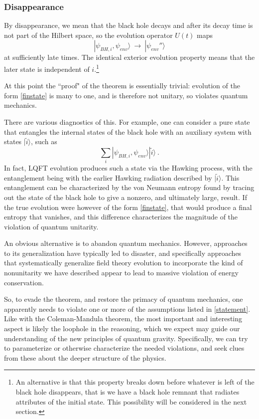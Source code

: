 \documentclass[11pt]{article}
\numberwithin{equation}{section}
\newcommand{\beq}{\begin{equation}}
\newcommand{\eeq}{\end{equation}}
\begin{document}
\subsubsection{Disappearance}

By disappearance, we mean that the black hole decays and after its decay time is not 
 part of the Hilbert space, so the evolution operator $U(t)$  maps
\beq\label{finstate}
|\psi_{BH,i},\psi_{env}\rangle\ \rightarrow\ |\psi_{env}''\rangle
\eeq
at sufficiently late times.  The identical exterior evolution property means that the later state is independent of $i$.\footnote{An alternative is that this property breaks down before whatever is left of the black hole disappears, that is we have a black hole remnant that radiates attributes of the initial state.  This possibility will be considered in the next section.}

At this point the ``proof" of the theorem is essentially trivial: evolution of the form \eqref{finstate} is many to one, and is therefore not unitary, so violates quantum mechanics.

There are various diagnostics of this.  For example, one can consider a pure state that entangles the internal states of the black hole with an auxiliary system with states $|\tilde i\rangle$, such as
\beq
\sum_i|\psi_{BH,i},\psi_{env}\rangle |\tilde i\rangle\ .
\eeq
In fact, LQFT evolution produces such a state via the Hawking process, with the entanglement being with the earlier Hawking radiation described by $|\tilde i\rangle$.  This entanglement  can be characterized by the von Neumann entropy found by tracing out the state of the black hole to give a nonzero, and ultimately large, result.  If the true evolution were  however of the form \eqref{finstate}, that would  produce a final entropy that vanishes, and this difference characterizes the magnitude of the violation of quantum unitarity.

An obvious alternative is to abandon quantum mechanics.  However, approaches to its generalization have typically led to disaster\cite{BPS,Polphone}, and specifically approaches that systematically generalize field theory evolution to incorporate the kind of nonunitarity we have described appear to lead to massive violation of energy conservation\cite{BPS}.

So, to evade the theorem, and restore the primacy of quantum mechanics, one apparently needs to violate one or more of the assumptions listed in \ref{statement}.  Like with the Coleman-Mandula theorem, the most important and interesting aspect is likely the loophole in the reasoning, which we expect may guide our understanding of the new principles of quantum gravity.  Specifically, we can try to parameterize or otherwise characterize the needed violations, and seek clues from these about the deeper structure of the physics.
\end{document}
